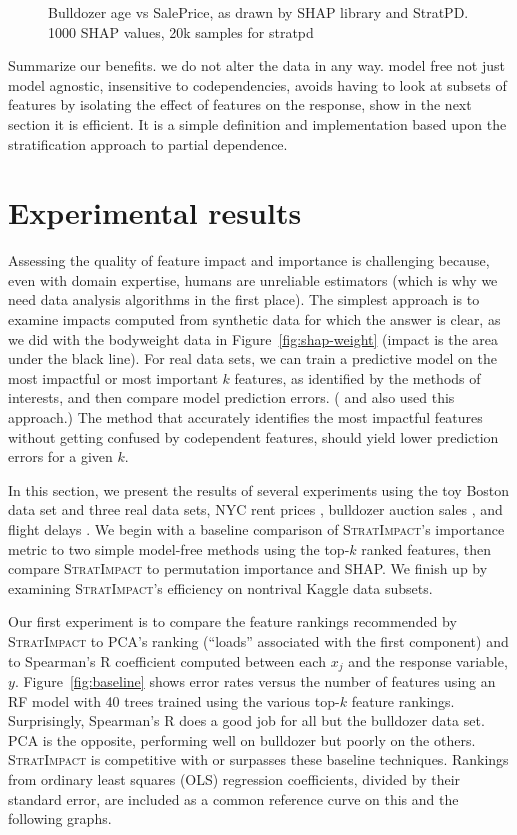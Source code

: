 \documentclass[11pt]{article}
\newcommand{\figref}[1]{Figure~\ref{#1}}
\newcommand{\todo}[1]{{{\color{red}{[#1]}}}}
\newcommand{\simp}{\fontfamily{cmr}\textsc{\small StratImpact}}
\begin{document}
\begin{figure}[htbp]
\begin{center}
\caption{\small Bulldozer age vs SalePrice, as drawn by SHAP library and StratPD. 1000 SHAP values, 20k samples for stratpd}
\label{fig:shap-stratpd-YearMade}
\end{center}
\end{figure}

Summarize our benefits. we do not alter the data in any way. model free not just model agnostic, insensitive to codependencies, avoids having to look at subsets of features by isolating the effect of features on the response, show in the next section it is efficient. It is a simple definition and implementation based upon the stratification approach to partial dependence. 

\section{Experimental results}\label{sec:experiments}

Assessing the quality of feature impact and importance is challenging because, even with domain expertise, humans are unreliable estimators (which is why we need data analysis algorithms in the first place).  The simplest approach is to examine impacts computed from synthetic data for which the answer is clear, as we did with the bodyweight data in \figref{fig:shap-weight} (impact is the area under the black line).  For real data sets, we can train a predictive model on the most impactful or most important $k$ features, as identified by the methods of interests, and then compare model prediction errors. (\citealt{mRMR} and \citealt{tsanas} also used this approach.) The method that accurately identifies the most impactful features without getting confused by codependent features, should yield lower prediction errors for a given $k$. 

In this section, we present the results of several experiments using the toy Boston data set and three real data sets, NYC rent prices \citep{rent}, bulldozer auction sales \citep{bulldozer}, and flight delays \citep{flights}. We begin with a baseline comparison of \simp{}'s importance metric to two simple model-free methods using the top-$k$ ranked features, then compare \simp{} to permutation importance and SHAP. We finish up by examining \simp's efficiency on nontrival Kaggle data subsets.

Our first experiment is to compare the feature rankings recommended by \simp{} to PCA's ranking (``loads'' associated with the first component) and to Spearman's R coefficient computed between each $x_j$ and the response variable, $y$. \figref{fig:baseline} shows error rates versus the number of features using an RF model with 40 trees trained using the various top-$k$ feature rankings. Surprisingly, Spearman's R does a good job for all but the bulldozer data set. PCA is the opposite, performing well on bulldozer but poorly on the others. \simp{} is competitive with or surpasses these baseline techniques.  Rankings from ordinary least squares (OLS) regression coefficients, divided by their standard error, are included as a common reference curve on this and the following graphs. \todo{25k records, 80/20 split, 40 trees etc..., 10 runs, 5-fold CV}
\end{document}
